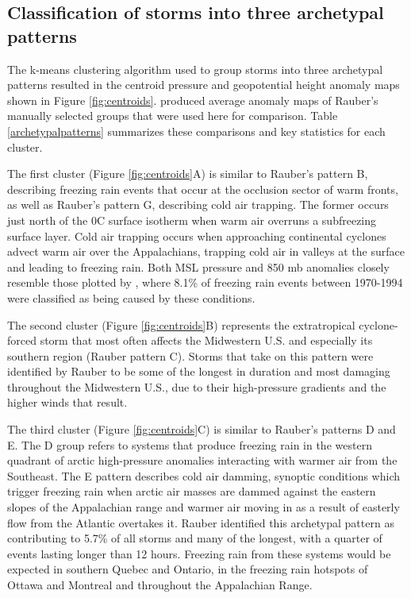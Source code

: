\documentclass[twocol]{ametsoc}
\begin{document}
\subsection{Classification of storms into three archetypal patterns}
The k-means clustering algorithm used to group storms into three archetypal patterns resulted in the centroid pressure and geopotential height anomaly maps shown in Figure \ref{fig:centroids}. \citet{erfani2012automated} produced average anomaly maps of Rauber's manually selected groups that were used here for comparison. Table \ref{archetypalpatterns} summarizes these comparisons and key statistics for each cluster.

The first cluster (Figure \ref{fig:centroids}A) is similar to Rauber's pattern B, describing freezing rain events that occur at the occlusion sector of warm fronts, as well as Rauber's pattern G, describing cold air trapping. The former occurs just north of the 0\degree C surface isotherm when warm air overruns a subfreezing surface layer. Cold air trapping occurs when approaching continental cyclones advect warm air over the Appalachians, trapping cold air in valleys at the surface and leading to freezing rain. Both MSL pressure and 850 mb anomalies closely resemble those plotted by \citet{rauber2001synoptic}, where  8.1\% of freezing rain events between 1970-1994 were classified as being caused by these conditions. 

The second cluster (Figure \ref{fig:centroids}B) represents the extratropical cyclone-forced storm that most often affects the Midwestern U.S. and especially its southern region (Rauber pattern C). Storms that take on this pattern were identified by Rauber to be some of the longest in duration and most damaging throughout the Midwestern U.S., due to their high-pressure gradients and the higher winds that result. 

The third cluster (Figure \ref{fig:centroids}C) is similar to Rauber's patterns D and E. The D group refers to systems that produce freezing rain in the western quadrant of arctic high-pressure anomalies interacting with warmer air from the Southeast. The E pattern describes cold air damming, synoptic conditions which trigger freezing rain when arctic air masses are dammed against the eastern slopes of the Appalachian range and warmer air moving in as a result of easterly flow from the Atlantic overtakes it. Rauber identified this archetypal pattern as contributing to 5.7\% of all storms and many of the longest, with a quarter of events lasting longer than 12 hours. Freezing rain from these systems would be expected in southern Quebec and Ontario, in the freezing rain hotspots of Ottawa and Montreal and throughout the Appalachian Range. 
\end{document}
